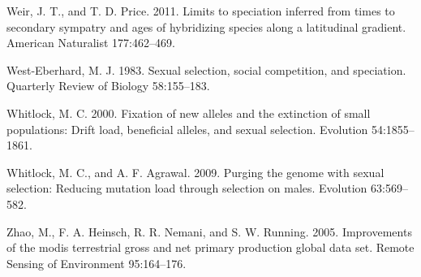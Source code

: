 \documentclass[]{article}
\begin{document}
\leavevmode\hypertarget{ref-Weir_2011}{}%
Weir, J. T., and T. D. Price. 2011. Limits to speciation inferred from
times to secondary sympatry and ages of hybridizing species along a
latitudinal gradient. American Naturalist 177:462--469.

\leavevmode\hypertarget{ref-west1983sexual}{}%
West-Eberhard, M. J. 1983. Sexual selection, social competition, and
speciation. Quarterly Review of Biology 58:155--183.

\leavevmode\hypertarget{ref-Whitlock_2000}{}%
Whitlock, M. C. 2000. Fixation of new alleles and the extinction of
small populations: Drift load, beneficial alleles, and sexual selection.
Evolution 54:1855--1861.

\leavevmode\hypertarget{ref-Whitlock_Agrawal_2009}{}%
Whitlock, M. C., and A. F. Agrawal. 2009. Purging the genome with sexual
selection: Reducing mutation load through selection on males. Evolution
63:569--582.

\leavevmode\hypertarget{ref-Zhao_2005}{}%
Zhao, M., F. A. Heinsch, R. R. Nemani, and S. W. Running. 2005.
Improvements of the modis terrestrial gross and net primary production
global data set. Remote Sensing of Environment 95:164--176.
\end{document}
